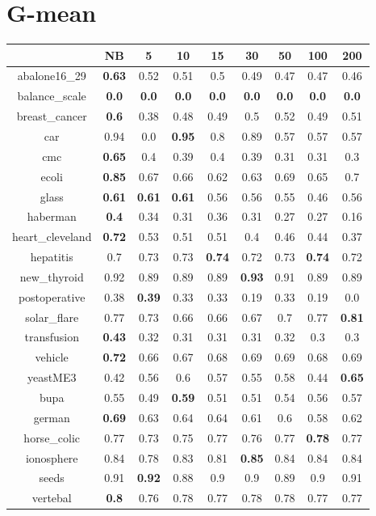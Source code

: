 \documentclass{article}%
\begin{document}
%
\section*{G{-}mean}%
\begin{tabular}{c|cccccccc}%
\hline%
&NB&5&10&15&30&50&100&200\\%
\hline%
abalone16\_29&\textbf{0.63}&0.52&0.51&0.5&0.49&0.47&0.47&0.46\\%
\hline%
balance\_scale&\textbf{0.0}&\textbf{0.0}&\textbf{0.0}&\textbf{0.0}&\textbf{0.0}&\textbf{0.0}&\textbf{0.0}&\textbf{0.0}\\%
\hline%
breast\_cancer&\textbf{0.6}&0.38&0.48&0.49&0.5&0.52&0.49&0.51\\%
\hline%
car&0.94&0.0&\textbf{0.95}&0.8&0.89&0.57&0.57&0.57\\%
\hline%
cmc&\textbf{0.65}&0.4&0.39&0.4&0.39&0.31&0.31&0.3\\%
\hline%
ecoli&\textbf{0.85}&0.67&0.66&0.62&0.63&0.69&0.65&0.7\\%
\hline%
glass&\textbf{0.61}&\textbf{0.61}&\textbf{0.61}&0.56&0.56&0.55&0.46&0.56\\%
\hline%
haberman&\textbf{0.4}&0.34&0.31&0.36&0.31&0.27&0.27&0.16\\%
\hline%
heart\_cleveland&\textbf{0.72}&0.53&0.51&0.51&0.4&0.46&0.44&0.37\\%
\hline%
hepatitis&0.7&0.73&0.73&\textbf{0.74}&0.72&0.73&\textbf{0.74}&0.72\\%
\hline%
new\_thyroid&0.92&0.89&0.89&0.89&\textbf{0.93}&0.91&0.89&0.89\\%
\hline%
postoperative&0.38&\textbf{0.39}&0.33&0.33&0.19&0.33&0.19&0.0\\%
\hline%
solar\_flare&0.77&0.73&0.66&0.66&0.67&0.7&0.77&\textbf{0.81}\\%
\hline%
transfusion&\textbf{0.43}&0.32&0.31&0.31&0.31&0.32&0.3&0.3\\%
\hline%
vehicle&\textbf{0.72}&0.66&0.67&0.68&0.69&0.69&0.68&0.69\\%
\hline%
yeastME3&0.42&0.56&0.6&0.57&0.55&0.58&0.44&\textbf{0.65}\\%
\hline%
bupa&0.55&0.49&\textbf{0.59}&0.51&0.51&0.54&0.56&0.57\\%
\hline%
german&\textbf{0.69}&0.63&0.64&0.64&0.61&0.6&0.58&0.62\\%
\hline%
horse\_colic&0.77&0.73&0.75&0.77&0.76&0.77&\textbf{0.78}&0.77\\%
\hline%
ionosphere&0.84&0.78&0.83&0.81&\textbf{0.85}&0.84&0.84&0.84\\%
\hline%
seeds&0.91&\textbf{0.92}&0.88&0.9&0.9&0.89&0.9&0.91\\%
\hline%
vertebal&\textbf{0.8}&0.76&0.78&0.77&0.78&0.78&0.77&0.77\\%
\hline%
\end{tabular}

%
\end{document}
